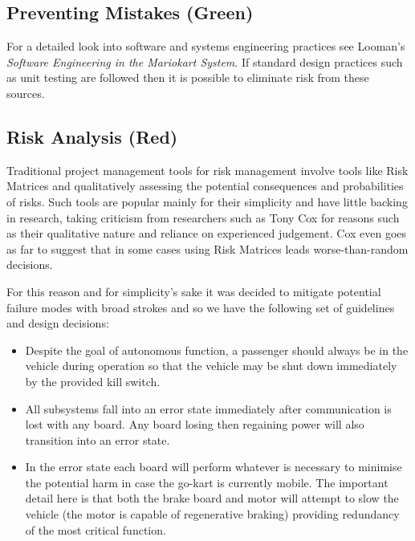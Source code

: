 \subsection{Preventing Mistakes (Green)}
For a detailed look into software and systems engineering practices see 
Looman's \emph{Software Engineering in the Mariokart System}\cite{
Software Engineering in the Mariokart System}. If standard design practices
such as unit testing are followed then it is possible to eliminate risk from these sources. 

\subsection{Risk Analysis (Red)}
Traditional project management tools for risk management involve tools
like Risk Matrices and qualitatively assessing the potential consequences and
probabilities of risks. Such tools are popular mainly for their simplicity
and have little backing in research, taking criticism from researchers such
as Tony Cox\cite{cox} for reasons such as their qualitative nature and reliance
on experienced judgement. Cox even goes as far to suggest that in some cases
using Risk Matrices leads worse-than-random decisions.

For this reason and for simplicity's sake it was decided to mitigate potential
failure modes with broad strokes and so we have the following set of guidelines
and design decisions:

\begin{itemize}
\item Despite the goal of autonomous function, a passenger should always be in
the vehicle during operation so that the vehicle may be shut down immediately 
by the provided kill switch.

\item All subsystems fall into an error state immediately after communication is
lost with any board. Any board losing then regaining power will also transition 
into an error state.

\item In the error state each board will perform whatever is necessary to minimise
the potential harm in case the go-kart is currently mobile. The important detail here
is that both the brake board and motor will attempt to slow the vehicle (the motor
is capable of regenerative braking) providing redundancy of the most critical function. 
\end{itemize}
 


